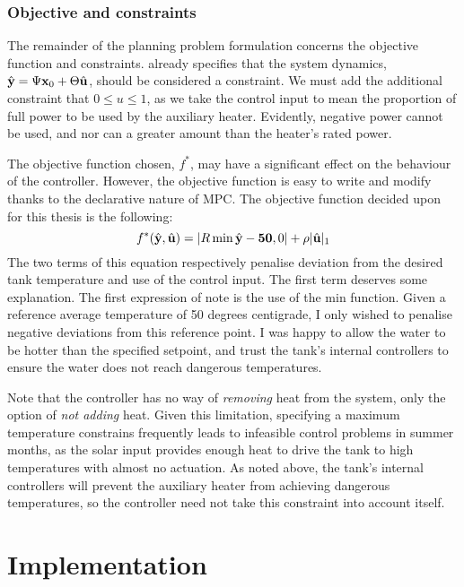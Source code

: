 \subsubsection{Objective and constraints}

The remainder of the planning problem formulation concerns the objective function and constraints.
 already specifies that the system dynamics, $\hat{\mathbf{y}} = \Psi \mathbf{x}_0 + \Theta \hat{\mathbf{u}}$, should be considered a constraint.
We must add the additional constraint that $0 \le u \le 1$, as we take the control input to mean the proportion of full power to be used by the auxiliary heater.
Evidently, negative power cannot be used, and nor can a greater amount than the heater's rated power.

The objective function chosen, $f^*$, may have a significant effect on the behaviour of the controller.
However, the objective function is easy to write and modify thanks to the declarative nature of MPC.
The objective function decided upon for this thesis is the following:
\begin{equation}
	f^*(\hat{\mathbf{y}}, \hat{\mathbf{u}}) = |R \min{\hat{\mathbf{y}} - \mathbf{50}, 0}| + \rho |\hat{\mathbf{u}}|_1
\end{equation}
The two terms of this equation respectively penalise deviation from the desired tank temperature and use of the control input.
The first term deserves some explanation.
The first expression of note is the use of the min function.
Given a reference average temperature of 50 degrees centigrade, I only wished to penalise negative deviations from this reference point.
I was happy to allow the water to be hotter than the specified setpoint, and trust the tank's internal controllers to ensure the water does not reach dangerous temperatures.

Note that the controller has no way of \emph{removing} heat from the system, only the option of \emph{not adding} heat.
Given this limitation, specifying a maximum temperature constrains frequently leads to infeasible control problems in summer months, as the solar input provides enough heat to drive the tank to high temperatures with almost no actuation.
As noted above, the tank's internal controllers will prevent the auxiliary heater from achieving dangerous temperatures, so the controller need not take this constraint into account itself.

\section{Implementation}

